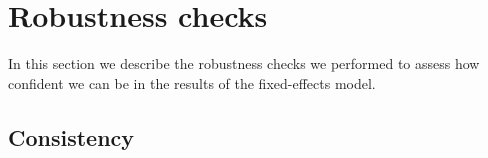 

\section{Robustness checks}\label{sec:robustness}
In this section we describe the robustness checks we performed to assess how confident we can be in the results of the fixed-effects model.

\subsection{Consistency}

